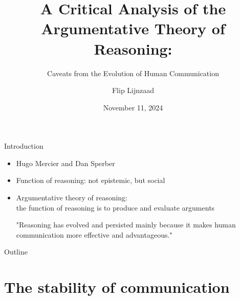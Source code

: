 \documentclass[xcolor=table]{beamer}       %
\title{A Critical Analysis of the Argumentative Theory of Reasoning:}
\subtitle{Caveats from the Evolution of Human Communication}
\author{Flip Lijnzaad}
\date{November 11, 2024}
\begin{document}
\maketitle

\begin{frame}{Introduction}
    \begin{itemize}
        \item Hugo Mercier and Dan Sperber
        \item Function of reasoning: not epistemic, but social
        \item Argumentative theory of reasoning: 
            \\ \alert{the function of reasoning is to produce and evaluate arguments}
    \begin{block}{\citet[p.~60]{MS11}}
        "Reasoning has evolved and persisted mainly because it makes human communication more effective and advantageous."
    \end{block}
    \end{itemize}
\end{frame}

\begin{frame}{Outline}
    \tableofcontents
\end{frame}

\section{The stability of communication}
\end{document}
